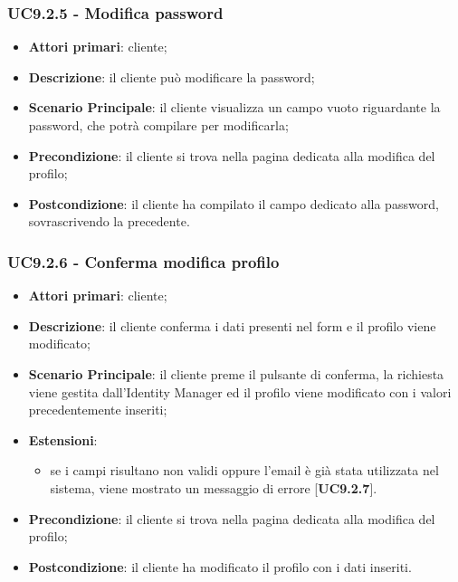 \subsubsection{UC9.2.5 - Modifica password}
\begin{itemize}
\item \textbf{Attori primari}: cliente;
\item \textbf{Descrizione}: il cliente può modificare la password;
\item \textbf{Scenario Principale}: il cliente visualizza un campo vuoto riguardante la password, che potrà compilare per modificarla;
\item \textbf{Precondizione}: il cliente si trova nella pagina dedicata alla modifica del profilo;
\item \textbf{Postcondizione}: il cliente ha compilato il campo dedicato alla password, sovrascrivendo la precedente.
\end{itemize}

\subsubsection{UC9.2.6 - Conferma modifica profilo}
\begin{itemize}
\item \textbf{Attori primari}: cliente;
\item \textbf{Descrizione}: il cliente conferma i dati presenti nel form e il profilo viene modificato;
\item \textbf{Scenario Principale}: il cliente preme il pulsante di conferma, la richiesta viene gestita dall'Identity Manager ed il profilo viene modificato con i valori precedentemente inseriti;
\item \textbf{Estensioni}: 
\begin{itemize}
\item se i campi risultano non validi oppure l'email è già stata utilizzata nel sistema, viene mostrato un messaggio di errore [\textbf{UC9.2.7}].
\end{itemize}
\item \textbf{Precondizione}: il cliente si trova nella pagina dedicata alla modifica del profilo;
\item \textbf{Postcondizione}: il cliente ha modificato il profilo con i dati inseriti.
\end{itemize}

